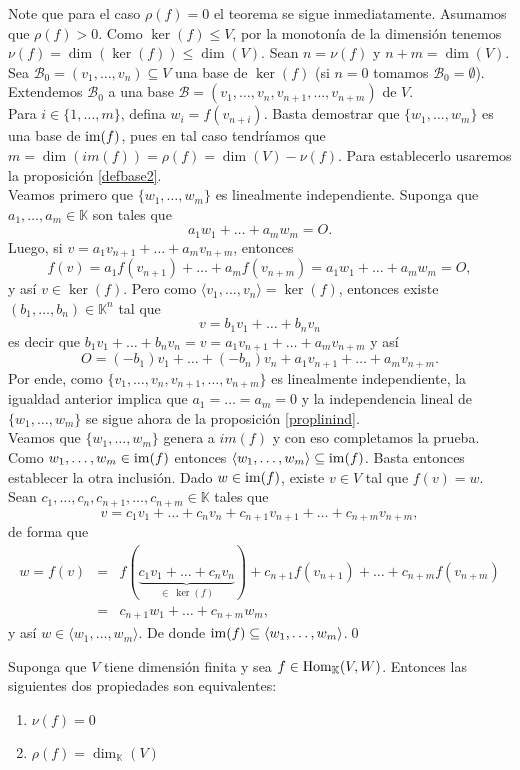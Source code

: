 \dem Note que para el caso $\rho(f)=0$ el teorema se sigue inmediatamente. Asumamos que $\rho(f)>0$. Como $\ker(f)\le V$, por la monoton\'ia de la dimensi\'on tenemos $\nu(f)=\dim\left(\ker(f)\right)\le\dim(V)$. Sean $n=\nu(f)$ y $n+m=\dim (V)$. Sea $\mathcal{B}_0=(v_1,\ldots,v_n)\subseteq V$ una base de $\ker(f)$ (si $n=0$ tomamos $\mathcal{B}_0=\emptyset$). Extendemos $\mathcal{B}_0$ a una base $\mathcal{B}=(v_1,\ldots,v_n,v_{n+1},\ldots,v_{n+m})$ de $V$.\\
Para $i\in\{1,\ldots,m\}$, defina $w_i=f(v_{n+i})$. Basta demostrar que $\{w_1,\ldots,w_m\}$ es una base de $\operatorname{im}(f)$, pues en tal caso tendr\'iamos que $m=\dim\left(im(f)\right)=\rho(f)=\dim (V)-\nu(f)$. Para establecerlo usaremos la proposici\'on \ref{defbase2}.\\
Veamos primero que $\{w_1,\ldots,w_m\}$ es linealmente independiente. Suponga que $a_1,\ldots,a_m\in \mathbb{K}$ son tales que
\[
a_1w_1+\ldots+a_mw_m=O.
\]
Luego, si $v=a_1v_{n+1}+\ldots+a_mv_{n+m}$, entonces
\[
f(v)=a_1f(v_{n+1})+\ldots+a_mf(v_{n+m})=a_1w_1+\ldots+a_mw_m=O,
\]
y as\'i $v\in\ker(f)$. Pero como $\langle v_1,\ldots,v_n\rangle=\ker(f)$, entonces existe $(b_1,\ldots,b_n)\in \mathbb{K}^n$ tal que
\[
v=b_1v_1+\ldots+b_nv_n
\]
es decir que $b_1v_1+\ldots+b_nv_n=v=a_1v_{n+1}+\ldots+a_mv_{n+m}$ y as\'i
\[
O=(-b_1)v_1+\ldots+(-b_n)v_n+a_1v_{n+1}+\ldots+a_mv_{n+m}.
\]
Por ende, como $\{v_1,\ldots,v_n,v_{n+1},\ldots,v_{n+m}\}$ es linealmente independiente, la igualdad anterior implica que $a_1=\ldots=a_m=0$ y la independencia lineal de $\{w_1,\ldots,w_m\}$ se sigue ahora de la  proposici\'on \ref{proplinind}.\\
Veamos que  $\{w_1,\ldots,w_m\}$ genera a $im(f)$ y con eso completamos la prueba. Como $w_1,\ldots,w_m\in \operatorname{im}(f)$ entonces $\langle w_1,\ldots,w_m\rangle\subseteq\operatorname{im}(f)$. Basta entonces establecer la otra inclusi\'on. Dado $w\in\operatorname{im}(f)$, existe $v\in V$ tal que $f(v)=w$. Sean $c_1,\ldots,c_n,c_{n+1},\ldots,c_{n+m}\in \mathbb{K}$ tales que 
\[
v=c_1v_1+\ldots+c_nv_n+c_{n+1}v_{n+1}+\ldots+c_{n+m}v_{n+m},
\]
de forma que
\begin{eqnarray*}
w=f(v) & = & f(\underbrace{c_1v_1+\ldots+c_nv_n}_{\in\ \ker(f)})+c_{n+1}f(v_{n+1})+\ldots+c_{n+m}f(v_{n+m})\\
           & = & c_{n+1}w_1+\ldots+c_{n+m}w_m,
\end{eqnarray*}
y as\'i $w\in\langle w_1,\ldots,w_m\rangle$. De donde $\operatorname{im}(f)\subseteq\langle w_1,\ldots,w_m\rangle$.\qed

\begin{coro}\label{corteorango}
Suponga que $V$ tiene dimensi\'on finita y sea $f\in\operatorname{Hom}_{\mathbb{K}}(V,W)$. Entonces las siguientes dos propiedades son equivalentes:
\begin{enumerate}
\item $\nu(f)=0$
\item $\rho(f)=\dim_{\mathbb{K}}(V)$
\end{enumerate}
\end{coro}

